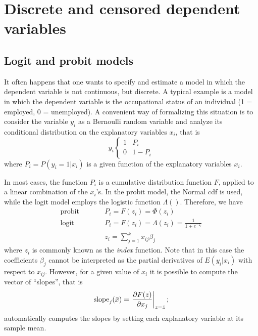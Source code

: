 \chapter{Discrete and censored dependent variables}
\label{chap:discr-models}

\section{Logit and probit models}
\label{sec:logit-probit}

It often happens that one wants to specify and estimate a model in
which the dependent variable is not continuous, but discrete. A
typical example is a model in which the dependent variable is the
occupational status of an individual (1 = employed, 0 = unemployed). A
convenient way of formalizing this situation is to consider the
variable $y_i$ as a Bernoulli random variable and analyze its
conditional distribution on the explanatory variables $x_i$, that is
\begin{equation}
  \label{eq:qr-Bernoulli}
  y_i \left\{ 
    \begin{array}{ll} 1 & P_i \\ 0 & 1 - P_i \end{array}
    \right. 
\end{equation}
where $P_i = P(y_i = 1 | x_i) $ is a given function of the explanatory
variables $x_i$.

In most cases, the function $P_i$ is a cumulative distribution
function $F$, applied to a linear combination of the $x_i$'s. In the
probit model, the Normal cdf is used, while the logit model employs
the logistic function $\Lambda()$. Therefore, we have
\begin{eqnarray}
  \label{eq:qr-link}
  \textrm{probit} & \qquad & P_i = F(z_i) = \Phi(z_i)  \\
  \textrm{logit}  & \qquad & P_i = F(z_i) = \Lambda(z_i) = \frac{1}{1 + e^{-z_i}} \\
  & &z_i = \sum_{j=1}^k x_{ij} \beta_j
\end{eqnarray}
where $z_i$ is commonly known as the \emph{index} function. Note that
in this case the coefficients $\beta_j$ cannot be interpreted as the
partial derivatives of $E(y_i | x_i)$ with respect to
$x_{ij}$. However, for a given value of $x_i$ it is possible to
compute the vector of ``slopes'', that is
\[
  \mathrm{slope}_j(\bar{x}) = \left. \frac{\partial F(z)}{\partial x_j} \right|_{z =
    \bar{z}} ;
\]
 automatically computes the slopes by setting each
explanatory variable at its sample mean.

